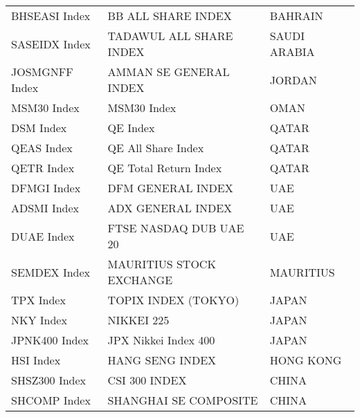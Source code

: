 \begin {table}[H]
\begin{center}
\begin{tabu}{| l l l |}
BHSEASI Index & BB ALL SHARE INDEX & BAHRAIN \\ 
SASEIDX Index & TADAWUL ALL SHARE INDEX & SAUDI ARABIA \\ 
JOSMGNFF Index & AMMAN SE GENERAL INDEX & JORDAN \\ 
MSM30 Index & MSM30 Index & OMAN \\ 
DSM Index & QE Index & QATAR \\ 
QEAS Index & QE All Share Index & QATAR \\ 
QETR Index & QE Total Return Index & QATAR \\ 
DFMGI Index & DFM GENERAL INDEX & UAE \\ 
ADSMI Index & ADX GENERAL INDEX & UAE \\ 
DUAE Index & FTSE NASDAQ DUB UAE 20 & UAE \\ 
SEMDEX Index & MAURITIUS STOCK EXCHANGE & MAURITIUS \\ 
TPX Index & TOPIX INDEX (TOKYO) & JAPAN \\ 
NKY Index & NIKKEI 225 & JAPAN \\ 
JPNK400 Index & JPX Nikkei Index 400 & JAPAN \\ 
HSI Index & HANG SENG INDEX & HONG KONG \\ 
SHSZ300 Index & CSI 300 INDEX & CHINA \\ 
SHCOMP Index & SHANGHAI SE COMPOSITE & CHINA \\ 


\hline
\end{tabu}
\hspace*{-3cm}
\small
\end{center}
\end{table}


